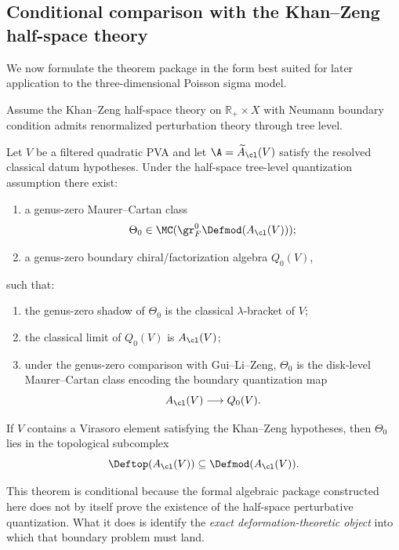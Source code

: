 \subsection{Conditional comparison with the Khan--Zeng half-space theory}

We now formulate the theorem package in the form best suited for later application to the
three-dimensional Poisson sigma model.

\begin{assumption}
Assume the Khan--Zeng half-space theory on $\mathbb R_+\times X$ with Neumann boundary
condition admits renormalized perturbation theory through tree level.
\end{assumption}

\begin{theorem}\label{thm:conditional-tree}
Let $V$ be a filtered quadratic PVA and let $\A=\widetilde A_{\cl}(V)$ satisfy the resolved
classical datum hypotheses. Under the half-space tree-level quantization assumption there
exist:
\begin{enumerate}[leftmargin=2.4em]
\item a genus-zero Maurer--Cartan class
\[
\Theta_0\in \MC(\gr_F^0\Defmod(A_{\cl}(V)));
\]
\item a genus-zero boundary chiral/factorization algebra $Q_0(V)$,
\end{enumerate}
such that:
\begin{enumerate}[label=\textnormal{(\alph*)},leftmargin=2.8em]
\item the genus-zero shadow of $\Theta_0$ is the classical $\lambda$-bracket of $V$;
\item the classical limit of $Q_0(V)$ is $A_{\cl}(V)$;
\item under the genus-zero comparison with Gui--Li--Zeng, $\Theta_0$ is the disk-level
Maurer--Cartan class encoding the boundary quantization map
\[
A_{\cl}(V)\longrightarrow Q_0(V).
\]
\end{enumerate}
If $V$ contains a Virasoro element satisfying the Khan--Zeng hypotheses, then $\Theta_0$
lies in the topological subcomplex
\[
\Deftop(A_{\cl}(V))\subseteq \Defmod(A_{\cl}(V)).
\]
\end{theorem}

\begin{remark}
This theorem is conditional because the formal algebraic package constructed here does not
by itself prove the existence of the half-space perturbative quantization. What it does is
identify the \emph{exact deformation-theoretic object} into which that boundary problem
must land.
\end{remark}

